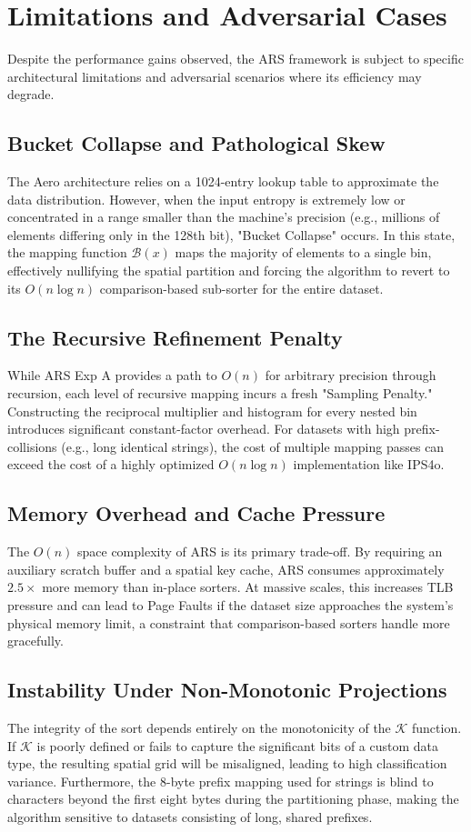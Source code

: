 \section{Limitations and Adversarial Cases}
Despite the performance gains observed, the ARS framework is subject to specific architectural limitations and adversarial scenarios where its efficiency may degrade.

\subsection{Bucket Collapse and Pathological Skew}
The Aero architecture relies on a 1024-entry lookup table to approximate the data distribution. However, when the input entropy is extremely low or concentrated in a range smaller than the machine's precision (e.g., millions of elements differing only in the 128th bit), "Bucket Collapse" occurs. In this state, the mapping function $\mathcal{B}(x)$ maps the majority of elements to a single bin, effectively nullifying the spatial partition and forcing the algorithm to revert to its $O(n \log n)$ comparison-based sub-sorter for the entire dataset.

\subsection{The Recursive Refinement Penalty}
While ARS Exp A provides a path to $O(n)$ for arbitrary precision through recursion, each level of recursive mapping incurs a fresh "Sampling Penalty." Constructing the reciprocal multiplier and histogram for every nested bin introduces significant constant-factor overhead. For datasets with high prefix-collisions (e.g., long identical strings), the cost of multiple mapping passes can exceed the cost of a highly optimized $O(n \log n)$ implementation like IPS4o.

\subsection{Memory Overhead and Cache Pressure}
The $O(n)$ space complexity of ARS is its primary trade-off. By requiring an auxiliary scratch buffer and a spatial key cache, ARS consumes approximately $2.5 \times$ more memory than in-place sorters. At massive scales, this increases TLB pressure and can lead to Page Faults if the dataset size approaches the system's physical memory limit, a constraint that comparison-based sorters handle more gracefully.

\subsection{Instability Under Non-Monotonic Projections}
The integrity of the sort depends entirely on the monotonicity of the $\mathcal{K}$ function. If $\mathcal{K}$ is poorly defined or fails to capture the significant bits of a custom data type, the resulting spatial grid will be misaligned, leading to high classification variance. Furthermore, the 8-byte prefix mapping used for strings is blind to characters beyond the first eight bytes during the partitioning phase, making the algorithm sensitive to datasets consisting of long, shared prefixes.

